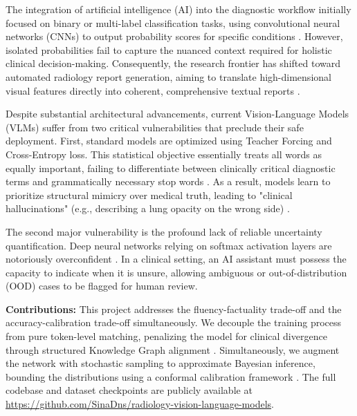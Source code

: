 \documentclass[10pt,a4paper,twocolumn]{article}
\begin{document}
The integration of artificial intelligence (AI) into the diagnostic workflow initially focused on binary or multi-label classification tasks, using convolutional neural networks (CNNs) to output probability scores for specific conditions \cite{rajpurkar2017chexnet}. However, isolated probabilities fail to capture the nuanced context required for holistic clinical decision-making. Consequently, the research frontier has shifted toward automated radiology report generation, aiming to translate high-dimensional visual features directly into coherent, comprehensive textual reports \cite{chen2020r2gen}.

Despite substantial architectural advancements, current Vision-Language Models (VLMs) suffer from two critical vulnerabilities that preclude their safe deployment. First, standard models are optimized using Teacher Forcing and Cross-Entropy loss. This statistical objective essentially treats all words as equally important, failing to differentiate between clinically critical diagnostic terms and grammatically necessary stop words \cite{miura2021improving}. As a result, models learn to prioritize structural mimicry over medical truth, leading to "clinical hallucinations" (e.g., describing a lung opacity on the wrong side) \cite{smit2020chexbert}. 

The second major vulnerability is the profound lack of reliable uncertainty quantification. Deep neural networks relying on softmax activation layers are notoriously overconfident \cite{kendall2017uncertainties}. In a clinical setting, an AI assistant must possess the capacity to indicate when it is unsure, allowing ambiguous or out-of-distribution (OOD) cases to be flagged for human review.

\textbf{Contributions:} This project addresses the fluency-factuality trade-off and the accuracy-calibration trade-off simultaneously. We decouple the training process from pure token-level matching, penalizing the model for clinical divergence through structured Knowledge Graph alignment \cite{jain2023radgraph}. Simultaneously, we augment the network with stochastic sampling to approximate Bayesian inference, bounding the distributions using a conformal calibration framework \cite{angelopoulos2020gentle}. The full codebase and dataset checkpoints are publicly available at \url{https://github.com/SinaDns/radiology-vision-language-models}.

\end{document}
